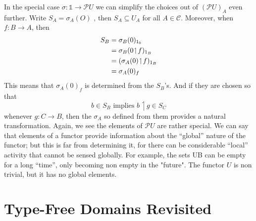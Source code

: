 \documentclass[12pt]{article}
\def\to{\rightarrow}
\def\id{{\textrm 1}}
\def\res{\!\upharpoonleft\!}
\def\bbone{\mathbb 1}
\def\C{\mathcal C}
\def\PU{\mathcal P U}
\begin{document}
In the special case $\sigma :\bbone \to \PU$ we can simplify the choices
out of $(\PU)_A$ even further. Write $S_A= \sigma_A(O)$ , then $S_A\subseteq U_A$ for all $A \in \C$. Moreover, when $f: B\to A$, then
\begin{align*}
S_B &= \sigma_B(0)_{\id_b}\\
&= \sigma_B(0 \res f)_{\id _B}\\
&= (\sigma_A(0) \res f)_{\id _B}\\
&= \sigma_A(0)_f
\end{align*}
This means that $\sigma_A(0)_f$ is determined from the $S_B$'s. And if they are chosen so that
$$
b \in S_B {\textrm{ implies }} b \res g \in S_C
$$
whenever $g: C\to B$, then the $\sigma_A$ so defined from them provides a
natural transformation. Again, we see the elements of $\PU$ are rather special. We can say that elements of a functor provide
information about the ``global'' nature of the functor; but this is far from determining it, for there can be considerable ``lo­cal'' activity that cannot be sensed globally. For example, the sets UB can be empty for a long ``time'', only becoming non­ empty in the "future". The functor $U$ is non trivial, but it has no global elements.

\section{Type-Free Domains Revisited}

\begin{thebibliography}{86}
\end{thebibliography}
\end{document}
